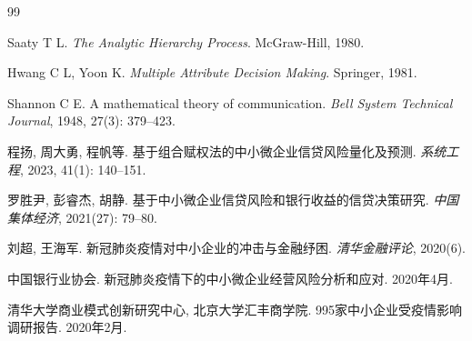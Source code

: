 \documentclass[12pt,a4paper]{ctexart}
\begin{document}
\begin{thebibliography}{99}

 Saaty T L. \textit{The Analytic Hierarchy Process}. McGraw-Hill, 1980.

 Hwang C L, Yoon K. \textit{Multiple Attribute Decision Making}. Springer, 1981.

 Shannon C E. A mathematical theory of communication. \textit{Bell System Technical Journal}, 1948, 27(3): 379--423.

 程扬, 周大勇, 程帆等. 基于组合赋权法的中小微企业信贷风险量化及预测. \textit{系统工程}, 2023, 41(1): 140--151.

 罗胜尹, 彭睿杰, 胡静. 基于中小微企业信贷风险和银行收益的信贷决策研究. \textit{中国集体经济}, 2021(27): 79--80.

 刘超, 王海军. 新冠肺炎疫情对中小企业的冲击与金融纾困. \textit{清华金融评论}, 2020(6).

 中国银行业协会. 新冠肺炎疫情下的中小微企业经营风险分析和应对. 2020年4月.

 清华大学商业模式创新研究中心, 北京大学汇丰商学院. 995家中小企业受疫情影响调研报告. 2020年2月.

\end{thebibliography}
\end{document}
